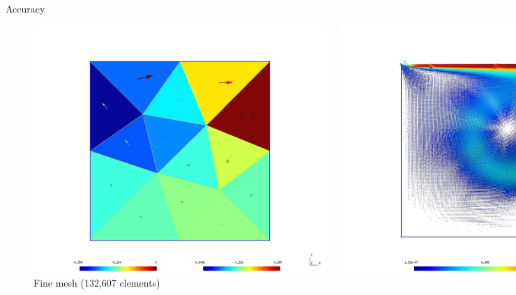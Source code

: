 \documentclass[xcolor=dvipsnames]{beamer}
\begin{document}
\begin{frame}{Accuracy}
\begin{figure}
  \centering
  \begin{columns}
    \centering
    \caption {Coarse mesh (48 elements)}
    \includegraphics[width=0.99\textwidth]{cavity_2d_tet_coarse}
    \centering
    \caption {Fine mesh (132,607 elements)}
    \includegraphics[width=0.99\textwidth]{cavity_2d_tet_fine}
  \end{columns}
\end{figure}
\end{frame}
\end{document}
